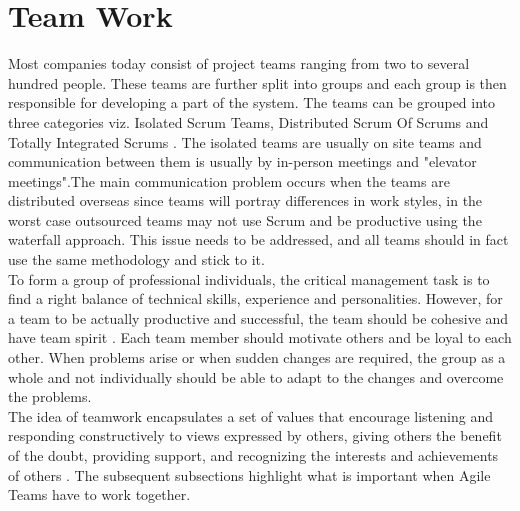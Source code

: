 \documentclass[sigplan,screen]{acmart}
\begin{document}
 
\section{Team Work}
Most companies today consist of project teams ranging from two to several hundred people. These teams are further split into groups and each group is then responsible for developing a part of the system. The teams can be grouped into three categories viz. Isolated Scrum Teams, Distributed Scrum Of Scrums and Totally Integrated Scrums \cite{Jeff}. 
The isolated teams are usually on site teams and communication between them is usually by in-person meetings and "elevator meetings".The main communication problem occurs when the teams are distributed overseas since teams will portray differences in work styles, in the worst case outsourced teams may not use Scrum and be productive using the waterfall approach. This issue needs to be addressed, and all teams should in fact use the same methodology and stick to it.\\
To form a group of professional individuals, the critical management task is to find a right balance of technical skills, experience and personalities. However, for a team to be actually productive and successful, the team should be cohesive and have team spirit \cite{Somerville}. Each team member should motivate others and  be loyal to each other. When problems arise or when sudden changes are required, the group as a whole and not individually should be able to adapt to the changes and overcome the problems.\\
The idea of teamwork encapsulates a set of values that encourage listening and responding constructively to views expressed by others, giving others the benefit of the doubt, providing support, and recognizing the interests and achievements of others \cite{Moe}.
The subsequent subsections highlight what is important when Agile Teams have to work together. 
\end{document}
